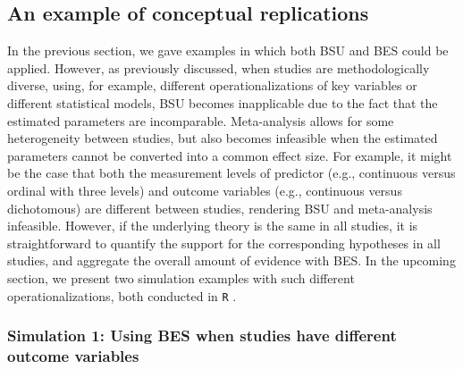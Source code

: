\documentclass[11pt,reqno]{article}
\begin{document}
\subsection{An example of conceptual replications}\label{GLMexample}

In the previous section, we gave examples in which both BSU and BES could be applied.
However, as previously discussed, when studies are methodologically diverse, using, for example, different operationalizations of key variables or different statistical models, BSU becomes inapplicable due to the fact that the estimated parameters are incomparable.
Meta-analysis allows for some heterogeneity between studies, but also becomes infeasible when the estimated parameters cannot be converted into a common effect size. 
For example, it might be the case that both the measurement levels of predictor (e.g., continuous versus ordinal with three levels) and outcome variables (e.g., continuous versus dichotomous) are different between studies, rendering BSU and meta-analysis infeasible.
However, if the underlying theory is the same in all studies, it is straightforward to quantify the support for the corresponding hypotheses in all studies, and aggregate the overall amount of evidence with BES. In the upcoming section, we present two simulation examples with such different operationalizations, both conducted in \texttt{R} \citep[][Version 4.2.1]{R}.

\subsubsection{Simulation 1: Using BES when studies have different outcome variables}
\end{document}
